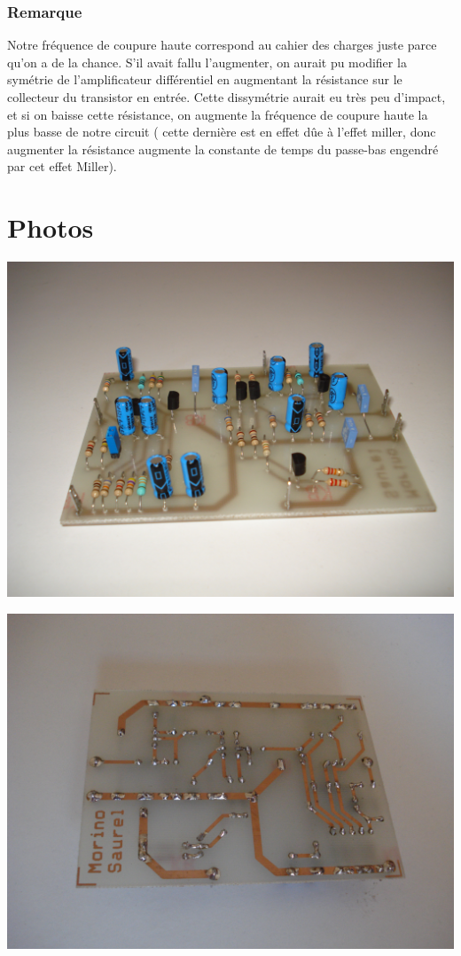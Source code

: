 \documentclass[11pt;a4paper]{report}
\begin{document}
  \subsection{Remarque}
   Notre fréquence de coupure haute correspond au cahier des charges juste parce qu'on a de la chance. S'il avait fallu l'augmenter, on aurait pu modifier la symétrie de l'amplificateur différentiel en augmentant la résistance sur le collecteur du transistor en entrée. Cette dissymétrie aurait eu très peu d'impact, et si on baisse cette résistance, on augmente la fréquence de coupure haute la plus basse de notre circuit ( cette dernière est en effet dûe à l'effet miller, donc augmenter la résistance augmente la constante de temps du passe-bas engendré par cet effet Miller).

  \chapter{Photos}
   \begin{center}
    \includegraphics[width=\linewidth]{images/recto}

    \includegraphics[width=\linewidth]{images/verso}
   \end{center}
\end{document}
